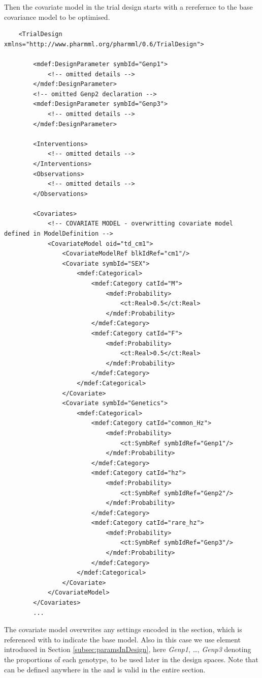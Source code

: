 Then the covariate model in the trial design starts with a rerefernce to the 
base covariance model to be optimised.
\lstset{language=XML}
\begin{lstlisting}
    <TrialDesign xmlns="http://www.pharmml.org/pharmml/0.6/TrialDesign">
        
        <mdef:DesignParameter symbId="Genp1">
            <!-- omitted details -->
        </mdef:DesignParameter>
        <!-- omitted Genp2 declaration -->
        <mdef:DesignParameter symbId="Genp3">
            <!-- omitted details -->
        </mdef:DesignParameter>
        
        <Interventions>
            <!-- omitted details -->
        </Interventions>            
        <Observations>
            <!-- omitted details -->
        </Observations>
        
        <Covariates>
            <!-- COVARIATE MODEL - overwritting covariate model defined in ModelDefinition -->
            <CovariateModel oid="td_cm1">
                <CovariateModelRef blkIdRef="cm1"/>
                <Covariate symbId="SEX">
                    <mdef:Categorical>
                        <mdef:Category catId="M">
                            <mdef:Probability>
                                <ct:Real>0.5</ct:Real>
                            </mdef:Probability>
                        </mdef:Category>
                        <mdef:Category catId="F">
                            <mdef:Probability>
                                <ct:Real>0.5</ct:Real>
                            </mdef:Probability>
                        </mdef:Category>
                    </mdef:Categorical>
                </Covariate>
                <Covariate symbId="Genetics">
                    <mdef:Categorical>
                        <mdef:Category catId="common_Hz">
                            <mdef:Probability>
                                <ct:SymbRef symbIdRef="Genp1"/>
                            </mdef:Probability>
                        </mdef:Category>
                        <mdef:Category catId="hz">
                            <mdef:Probability>
                                <ct:SymbRef symbIdRef="Genp2"/>
                            </mdef:Probability>
                        </mdef:Category>
                        <mdef:Category catId="rare_hz">
                            <mdef:Probability>
                                <ct:SymbRef symbIdRef="Genp3"/>
                            </mdef:Probability>
                        </mdef:Category>
                    </mdef:Categorical>
                </Covariate>
            </CovariateModel>            
        </Covariates>
        ...
\end{lstlisting}
The covariate model overwrites any settings encoded in the 
section, which is referenced with  
to indicate the base model.
Also in this case we use  element introduced in Section 
\ref{subsec:paramsInDesign}, here \emph{Genp1}, \dots, \emph{Genp3} denoting 
the proportions of each genotype, to be used later in the design spaces. Note that
 can be defined anywhere in the  and 
is valid in the entire section.

